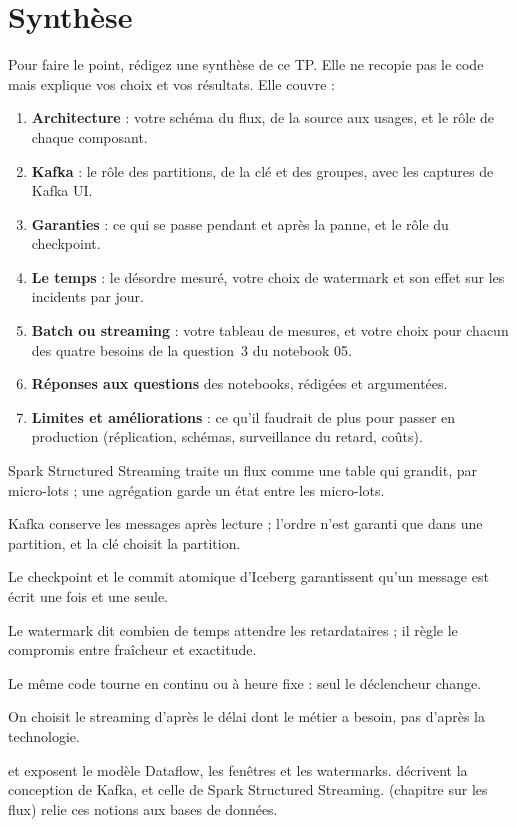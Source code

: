 \section{Synthèse}\label{c6:sec:livrables}

Pour faire le point, rédigez une synthèse de ce TP. Elle ne recopie pas le code mais explique
vos choix et vos résultats. Elle couvre :
\begin{enumerate}[leftmargin=*,itemsep=2pt]
  \item \textbf{Architecture} : votre schéma du flux, de la source aux usages, et le rôle de chaque composant.
  \item \textbf{Kafka} : le rôle des partitions, de la clé et des groupes, avec les captures de Kafka UI.
  \item \textbf{Garanties} : ce qui se passe pendant et après la panne, et le rôle du checkpoint.
  \item \textbf{Le temps} : le désordre mesuré, votre choix de watermark et son effet sur les
        incidents par jour.
  \item \textbf{Batch ou streaming} : votre tableau de mesures, et votre choix pour chacun des quatre
        besoins de la question~3 du notebook 05.
  \item \textbf{Réponses aux questions} des notebooks, rédigées et argumentées.
  \item \textbf{Limites et améliorations} : ce qu'il faudrait de plus pour passer en production
        (réplication, schémas, surveillance du retard, coûts).
\end{enumerate}

\begin{aretenir}
  \item Spark Structured Streaming traite un flux comme une table qui grandit, par micro-lots ; une agrégation garde un état entre les micro-lots.
  \item Kafka conserve les messages après lecture ; l'ordre n'est garanti que dans une partition, et la clé choisit la partition.
  \item Le checkpoint et le commit atomique d'Iceberg garantissent qu'un message est écrit une fois et une seule.
  \item Le watermark dit combien de temps attendre les retardataires ; il règle le compromis entre fraîcheur et exactitude.
  \item Le même code tourne en continu ou à heure fixe : seul le déclencheur change.
  \item On choisit le streaming d'après le délai dont le métier a besoin, pas d'après la technologie.
\end{aretenir}

\begin{plusloin}
\citet{akidau2015} et \citet{akidau2018} exposent le modèle Dataflow, les fenêtres et les watermarks. \citet{kreps2011} décrivent la conception de Kafka, et \citet{armbrust2018} celle de Spark Structured Streaming. \citet{kleppmann2017} (chapitre sur les flux) relie ces notions aux bases de données.
\end{plusloin}
